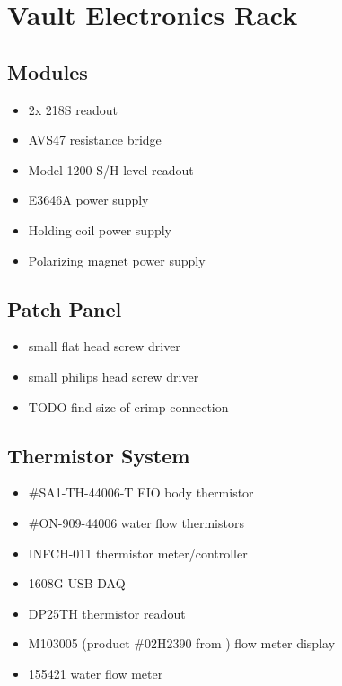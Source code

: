 \section{Vault Electronics Rack}
\subsection{Modules}
\begin{itemize}
 \item 2x  218S readout
\item AVS47 resistance bridge
\item {} Model 1200 S/H level readout
\item {} E3646A power supply
\item Holding coil power supply
\item Polarizing magnet power supply
\end{itemize}
  \subsection{Patch Panel}
\begin{itemize}
 \item small flat head screw driver
 \item small philips head screw driver
\item TODO find size of crimp connection
\end{itemize}
\subsection{Thermistor System}
\begin{itemize}
 \item {} \#SA1-TH-44006-T EIO body thermistor
 \item {} \#ON-909-44006 water flow thermistors
 \item {} INFCH-011 thermistor meter/controller
 \item {} 1608G USB DAQ
 \item {} DP25TH thermistor readout
 \item {} M103005 (product \#02H2390 from ) flow meter display
 \item {} 155421 water flow meter
\end{itemize}


